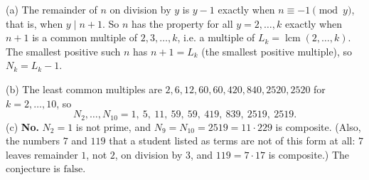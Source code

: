 (a) The remainder of $n$ on division by $y$ is $y-1$ exactly when $n\equiv-1\pmod y$, that is, when $y\mid n+1$. So $n$ has the property for all $y=2,\dots,k$ exactly when $n+1$ is a common multiple of $2,3,\dots,k$, i.e. a multiple of $L_k=\operatorname{lcm}(2,\dots,k)$. The smallest positive such $n$ has $n+1=L_k$ (the smallest positive multiple), so $N_k=L_k-1$.

(b) The least common multiples are $2,6,12,60,60,420,840,2520,2520$ for $k=2,\dots,10$, so
\[
N_2,\dots,N_{10}=1,\ 5,\ 11,\ 59,\ 59,\ 419,\ 839,\ 2519,\ 2519 .
\]
(c) \textbf{No.} $N_2=1$ is not prime, and $N_9=N_{10}=2519=11\cdot229$ is composite. (Also, the numbers $7$ and $119$ that a student listed as terms are not of this form at all: $7$ leaves remainder $1$, not $2$, on division by $3$, and $119=7\cdot17$ is composite.) The conjecture is $\boxed{\text{false}}$.
